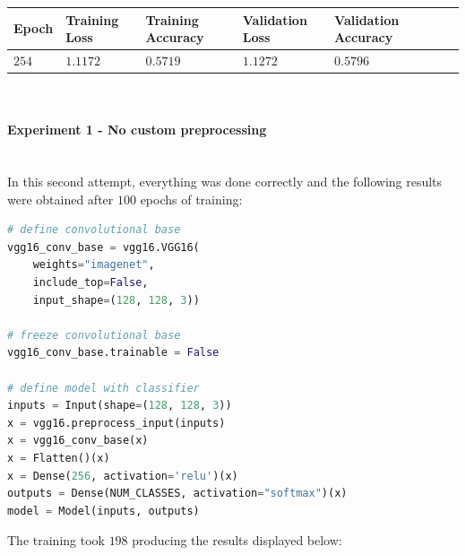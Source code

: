 \documentclass[11pt,a4paper]{article}
\begin{document}
\begin{center}
\hspace*{-0.8cm}
\begin{tabular}{|p{1.2cm}|p{1.8cm}|p{2cm}|p{2cm}|p{2cm}|p{2cm}|p{2cm}|}
\rowcolor{gray!50}
\hline
\textbf{Epoch} & \textbf{Training Loss} & \textbf{Training Accuracy} & \textbf{Validation Loss} & \textbf{Validation Accuracy}\\
\hline
$254$ & $1.1172$ & $0.5719$ & $1.1272$ & $0.5796$\\
\hline
\end{tabular}\\
\end{center}
\paragraph{Experiment 1 - No custom preprocessing}\mbox{}\\
In this second attempt, everything was done correctly and the following results were obtained after $100$ epochs of training:
\begin{lstlisting}[language=Python,frame=single]
# define convolutional base
vgg16_conv_base = vgg16.VGG16(
    weights="imagenet",
    include_top=False,
    input_shape=(128, 128, 3))

# freeze convolutional base
vgg16_conv_base.trainable = False

# define model with classifier
inputs = Input(shape=(128, 128, 3))
x = vgg16.preprocess_input(inputs)
x = vgg16_conv_base(x)
x = Flatten()(x)
x = Dense(256, activation='relu')(x)
outputs = Dense(NUM_CLASSES, activation="softmax")(x)
model = Model(inputs, outputs)
\end{lstlisting}
The training took $198$ producing the results displayed below:
\end{document}

